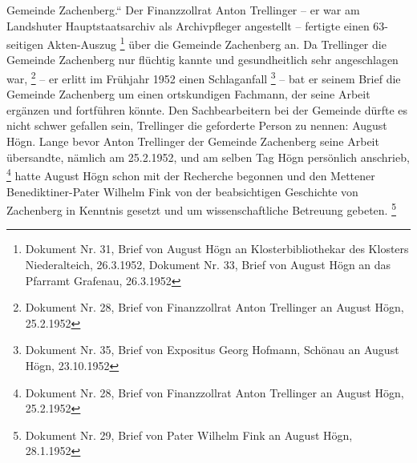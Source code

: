 \documentclass[a4paper]{article}
\begin{document}
Gemeinde Zachenberg.“ Der Finanzzollrat Anton Trellinger – er war am
Landshuter Hauptstaatsarchiv als Archivpfleger angestellt – fertigte
einen 63-seitigen Akten-Auszug \footnote{Dokument Nr. 31, Brief von
August Högn an Klosterbibliothekar des Klosters Niederalteich,
26.3.1952, Dokument Nr. 33, Brief von August Högn an das Pfarramt
Grafenau, 26.3.1952} über die Gemeinde Zachenberg an. Da Trellinger die
Gemeinde Zachenberg nur flüchtig kannte und gesundheitlich sehr
angeschlagen war, \footnote{Dokument Nr. 28, Brief von Finanzzollrat
Anton Trellinger an August Högn, 25.2.1952} – er erlitt im Frühjahr
1952 einen Schlaganfall \footnote{Dokument Nr. 35, Brief von Expositus
Georg Hofmann, Schönau an August Högn, 23.10.1952} – bat er seinem
Brief die Gemeinde Zachenberg um einen ortskundigen Fachmann, der seine
Arbeit ergänzen und fortführen könnte. Den Sachbearbeitern bei der
Gemeinde dürfte es nicht schwer gefallen sein, Trellinger die
geforderte Person zu nennen: August Högn. Lange bevor Anton Trellinger
der Gemeinde Zachenberg seine Arbeit übersandte, nämlich am 25.2.1952,
und am selben Tag Högn persönlich anschrieb, \footnote{Dokument Nr. 28,
Brief von Finanzzollrat Anton Trellinger an August Högn, 25.2.1952}
hatte August Högn schon mit der Recherche begonnen und den Mettener
Benediktiner-Pater Wilhelm Fink von der beabsichtigen Geschichte von
Zachenberg in Kenntnis gesetzt und um wissenschaftliche Betreuung
gebeten. \footnote{Dokument Nr. 29, Brief von Pater Wilhelm Fink an
August Högn, 28.1.1952}
\end{document}
